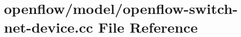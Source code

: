 \hypertarget{openflow-switch-net-device_8cc}{}\section{openflow/model/openflow-\/switch-\/net-\/device.cc File Reference}
\label{openflow-switch-net-device_8cc}
